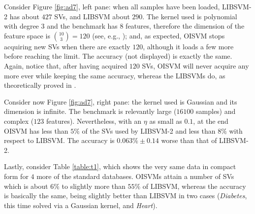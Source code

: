 Consider Figure \ref{fig:ad7}, left pane: when all samples have been
loaded, LIBSVM-2 has about $427$ SVs, and LIBSVM about $290$. The
kernel used is polynomial with degree $3$ and the benchmark has $8$
features, therefore the dimension of the feature space is
$\binom{10}{3} = 120$ (see, e.g., \cite{Burges98}); and, as expected,
OISVM stops acquiring new SVs when there are exactly $120$, although
it loads a few more before reaching the limit. The accuracy (not
displayed) is exactly the same. Again, notice that, after having
acquired $120$ SVs, OISVM will never acquire any more ever while
keeping the same accuracy, whereas the LIBSVMs do, as theoretically
proved in \cite{Steinwart03}.

Consider now Figure \ref{fig:ad7}, right pane: the kernel used is
Gaussian and its dimension is infinite. The benchmark is relevantly
large ($16100$ samples) and complex ($123$ features). Nevertheless,
with an $\eta$ as small as $0.1$, at the end OISVM has less than $5\%$
of the SVs used by LIBSVM-2 and less than $8\%$ with respect to
LIBSVM. The accuracy is $0.063\%\pm0.14$ worse than that of LIBSVM-2.

Lastly, consider Table \ref{table:t1}, which shows the very same data
in compact form for $4$ more of the standard databases. OISVMs attain
a number of SVs which is about $6\%$ to slightly more than $55\%$ of
LIBSVM, whereas the accuracy is basically the same, being slightly
better than LIBSVM in two cases (\emph{Diabetes}, this time solved via
a Gaussian kernel, and \emph{Heart}).
